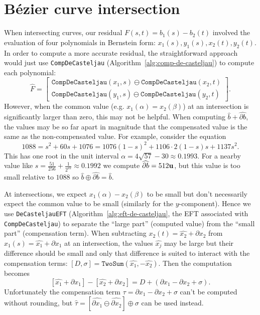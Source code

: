 \section{B\'{e}zier curve intersection}\label{sec:compensated-curve-intersect}

When intersecting curves, our residual \(F(s, t) = b_1(s) - b_2(t)\) involved
the evaluation of four polynomials in Bernstein form: \(x_1(s), y_1(s),
x_2(t), y_2(t)\). In order to compute a more accurate residual, the
straightforward approach would just use \texttt{CompDeCasteljau}
(Algorithm~\ref{alg:comp-de-casteljau}) to compute each
polynomial:
\begin{equation}
\widehat{F} = \left[ \begin{array}{c}
  \mathtt{CompDeCasteljau}(x_1, s) \ominus \mathtt{CompDeCasteljau}(x_2, t) \\
  \mathtt{CompDeCasteljau}(y_1, s) \ominus \mathtt{CompDeCasteljau}(y_2, t)
  \end{array}\right].
\end{equation}
However, when the common value (e.g. \(x_1(\alpha) = x_2(\beta)\)) at an
intersection is significantly larger than zero, this may not be helpful.
When computing \(\widehat{b} + \widehat{\partial b}\), the values may
be so far apart in magnitude that the compensated value is the same
as the non-compensated value. For example, consider the equation
\begin{equation}
1088 = s^2 + 60 s + 1076 = 1076 (1 - s)^2 + 1106 \cdot 2(1 - s)s + 1137s^2.
\end{equation}
This has one root in the unit interval \(\alpha = 4 \sqrt{57} - 30 \approx
0.1993\). For a nearby value like \(s = \frac{51}{256} + \frac{1}{2^{22}}
\approx 0.1992\) we compute \(\widehat{\partial b} = 512 \mathbf{u}\), but this
value is too small relative to \(1088\) so
\(\widehat{b} \oplus \widehat{\partial b} = \widehat{b}\).

At intersections, we expect \(x_1(\alpha) - x_2(\beta)\) to be small
but don't necessarily expect the common value to be small (similarly for
the \(y\)-component). Hence we use \texttt{DeCasteljauEFT}
(Algorithm~\ref{alg:eft-de-casteljau}, the EFT associated with
\texttt{CompDeCasteljau}) to separate the ``large part'' (computed value)
from the ``small part'' (compensation term).
When subtracting \(x_2(t) = \widehat{x_2} +
\partial x_2\) from \(x_1(s) = \widehat{x_1} +
\partial x_1\) at an intersection, the values \(\widehat{x_j}\) may
be large but their difference should be small and only that difference
is suited to interact with the compensation terms:
\(\left[D, \sigma\right] =
\mathtt{TwoSum}(\widehat{x_1}, -\widehat{x_2})\). Then the
computation becomes
\begin{equation}
\left[\widehat{x_1} + \partial x_1\right] -
\left[\widehat{x_2} + \partial x_2\right] =
D + \left(\partial x_1 - \partial x_2 + \sigma\right).
\end{equation}
Unfortunately the compensation term \(\tau = \partial x_1 -
\partial x_2 + \sigma\) can't be computed without rounding,
but \(\widehat{\tau} = \left[\widehat{\partial x_1} \ominus
\widehat{\partial x_2}\right] \oplus \sigma\) can be used instead.

